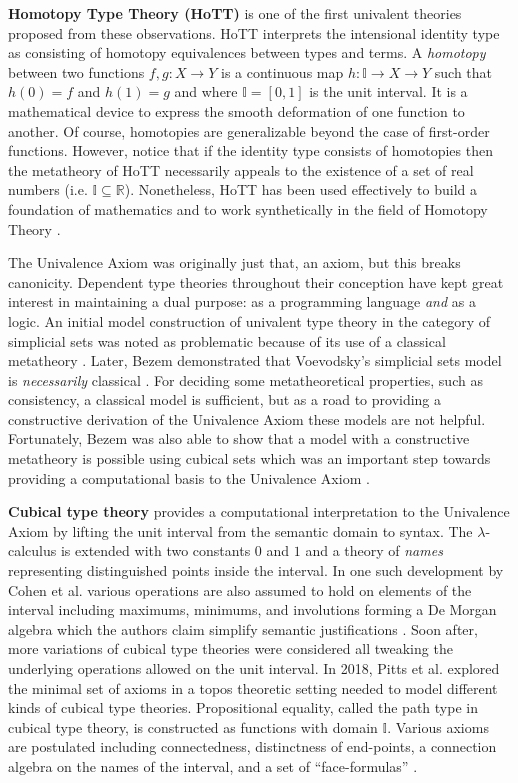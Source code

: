 \textbf{Homotopy Type Theory (HoTT)} is one of the first univalent theories proposed from these observations.
HoTT interprets the intensional identity type as consisting of homotopy equivalences between types and terms.
A \textit{homotopy} between two functions $f, g : X \to Y$ is a continuous map $h : \mathbb{I} \to X \to Y$ such that $h(0) = f$ and $h(1) = g$ and where $\mathbb{I} = [0, 1]$ is the unit interval.
It is a mathematical device to express the smooth deformation of one function to another.
Of course, homotopies are generalizable beyond the case of first-order functions.
However, notice that if the identity type consists of homotopies then the metatheory of HoTT necessarily appeals to the existence of a set of real numbers (i.e. $\mathbb{I} \subseteq \mathbb{R}$).
Nonetheless, HoTT has been used effectively to build a foundation of mathematics and to work synthetically in the field of Homotopy Theory \cite{hottbook}.

The Univalence Axiom was originally just that, an axiom, but this breaks canonicity.
Dependent type theories throughout their conception have kept great interest in maintaining a dual purpose: as a programming language \textit{and} as a logic.
An initial model construction of univalent type theory in the category of simplicial sets was noted as problematic because of its use of a classical metatheory \cite{kapulkin2012}.
Later, Bezem demonstrated that Voevodsky's simplicial sets model is \textit{necessarily} classical \cite{bezem2015}.
For deciding some metatheoretical properties, such as consistency, a classical model is sufficient, but as a road to providing a constructive derivation of the Univalence Axiom these models are not helpful.
Fortunately, Bezem was also able to show that a model with a constructive metatheory is possible using cubical sets which was an important step towards providing a computational basis to the Univalence Axiom \cite{bezem2014}.

\textbf{Cubical type theory} provides a computational interpretation to the Univalence Axiom by lifting the unit interval from the semantic domain to syntax.
The $\lambda$-calculus is extended with two constants $0$ and $1$ and a theory of \textit{names} representing distinguished points inside the interval.
In one such development by Cohen et al. various operations are also assumed to hold on elements of the interval including maximums, minimums, and involutions forming a De Morgan algebra which the authors claim simplify semantic justifications \cite{cohen2016}.
Soon after, more variations of cubical type theories were considered all tweaking the underlying operations allowed on the unit interval.
In 2018, Pitts et al. explored the minimal set of axioms in a topos theoretic setting needed to model different kinds of cubical type theories.
Propositional equality, called the path type in cubical type theory, is constructed as functions with domain $\mathbb{I}$.
Various axioms are postulated including connectedness, distinctness of end-points, a connection algebra on the names of the interval, and a set of ``face-formulas'' \cite{pitts2018}.

